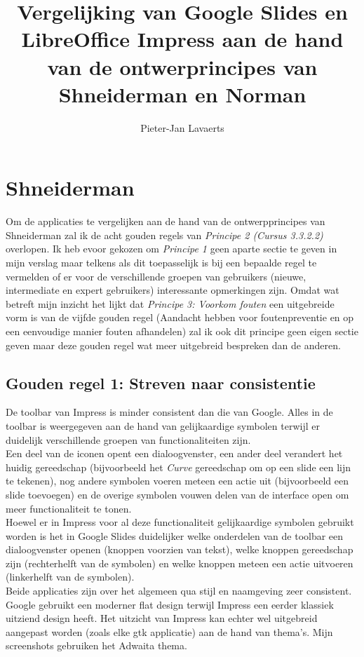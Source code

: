 \documentclass[a4paper]{article}
\title{Vergelijking van Google Slides en LibreOffice Impress aan de hand van de ontwerprincipes van Shneiderman en Norman}
\author{Pieter-Jan Lavaerts}
\begin{document}
\maketitle
\section{Shneiderman}
Om de applicaties te vergelijken aan de hand van de ontwerpprincipes van Shneiderman zal ik de acht gouden regels van \emph{Principe 2 (Cursus 3.3.2.2)} overlopen. Ik heb evoor gekozen om \emph{Principe 1} geen aparte sectie te geven in mijn verslag maar telkens als dit toepasselijk is bij een bepaalde regel te vermelden of er voor de verschillende groepen van gebruikers (nieuwe, intermediate en expert gebruikers) interessante opmerkingen zijn.\newline
Omdat wat betreft mijn inzicht het lijkt dat \emph{Principe 3: Voorkom fouten} een uitgebreide vorm is van de vijfde gouden regel (Aandacht hebben voor foutenpreventie en op een eenvoudige manier fouten afhandelen) zal ik ook dit principe geen eigen sectie geven maar deze gouden regel wat meer uitgebreid bespreken dan de anderen.
\subsection{Gouden regel 1: Streven naar consistentie}
De toolbar van Impress is minder consistent dan die van Google. Alles in de toolbar is weergegeven aan de hand van gelijkaardige symbolen terwijl er duidelijk verschillende groepen van functionaliteiten zijn.\\
Een deel van de iconen opent een dialoogvenster, een ander deel verandert het huidig gereedschap (bijvoorbeeld het \emph{Curve} gereedschap om op een slide een lijn te tekenen), nog andere symbolen voeren meteen een actie uit (bijvoorbeeld een slide toevoegen) en de overige symbolen vouwen delen van de interface open om meer functionaliteit te tonen.\\
Hoewel er in Impress voor al deze functionaliteit gelijkaardige symbolen gebruikt worden is het in Google Slides duidelijker welke onderdelen van de toolbar een dialoogvenster openen (knoppen voorzien van tekst), welke knoppen gereedschap zijn (rechterhelft van de symbolen) en welke knoppen meteen een actie uitvoeren (linkerhelft van de symbolen).
\\
Beide applicaties zijn over het algemeen qua stijl en naamgeving zeer consistent. Google gebruikt een moderner flat design terwijl Impress een eerder klassiek uitziend design heeft. Het uitzicht van Impress kan echter wel uitgebreid aangepast worden (zoals elke gtk applicatie) aan de hand van thema's. Mijn screenshots gebruiken het Adwaita thema.
\end{document}
